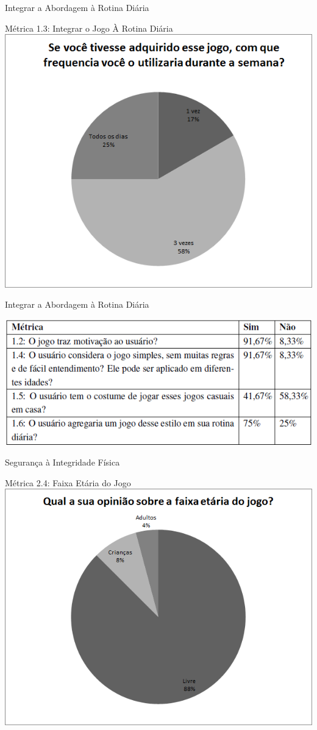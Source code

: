 \documentclass{beamer}
\begin{document}
\begin{frame}{Integrar a Abordagem à Rotina Diária} 
    \begin{block}{Métrica 1.3: Integrar o Jogo À Rotina Diária}
			\center \includegraphics[height=2.6 in]{img/chart_3-.png}
    \end{block}
\end{frame}

\begin{frame}{Integrar a Abordagem à Rotina Diária} 
    \begin{block}{}
			\center \includegraphics[height=1.4 in]{img/metricasq1.png}
    \end{block}
\end{frame}

\begin{frame}{Segurança à Integridade Física} 
    \begin{block}{Métrica 2.4: Faixa Etária do Jogo}
			\center \includegraphics[height=2.6 in]{img/chart_10-.png}
    \end{block}
\end{frame}
\end{document}
